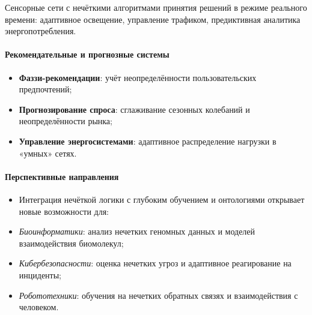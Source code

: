 Сенсорные сети с нечёткими алгоритмами принятия решений в режиме реального времени: адаптивное освещение, управление трафиком, предиктивная аналитика энергопотребления.

\paragraph{Рекомендательные и прогнозные системы}
\begin{itemize}
  \item \textbf{Фаззи-рекомендации}: учёт неопределённости пользовательских предпочтений;
  \item \textbf{Прогнозирование спроса}: сглаживание сезонных колебаний и неопределённости рынка;
  \item \textbf{Управление энергосистемами}: адаптивное распределение нагрузки в «умных» сетях.
\end{itemize}

\paragraph{Перспективные направления}
\begin{itemize}
  \item[] Интеграция нечёткой логики с глубоким обучением и онтологиями открывает новые возможности для:
  \item \emph{Биоинформатики}: анализ нечетких геномных данных и моделей взаимодействия биомолекул;
  \item \emph{Кибербезопасности}: оценка нечетких угроз и адаптивное реагирование на инциденты;
  \item \emph{Робототехники}: обучения на нечетких обратных связях и взаимодействия с человеком.
\end{itemize}

